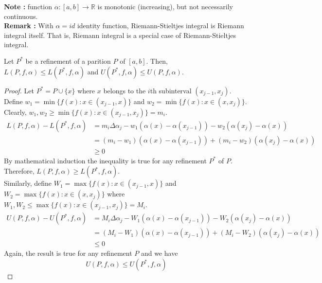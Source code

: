 \textbf{Note : } function $\alpha : [a,b] \to \mathbb{R}$ is monotonic (increasing), but not necessarily continuous.\\

\textbf{Remark : } With $\alpha = id$ identity function, Riemann-Stieltjes integral is Riemann integral itself.
	That is, Riemann integral is a special case of Riemann-Stieltjes integral.

\begin{theorem}
	Let $P^\ast$ be a refinement of a parition $P$ of $[a,b]$.
	Then, $L(P,f,\alpha) \le L(P^\ast,f,\alpha)$ and $U(P^\ast,f,\alpha) \le U(P,f,\alpha)$.
\end{theorem}
\begin{proof}
	Let $P^\ast = P \cup \{ x \}$ where $x$ belongs to the $i$th subinterval $(x_{j-1},x_j)$.
	Define $w_1 = \min \{ f(x) : x \in (x_{j-1},x) \}$ and $w_2 = \min \{ f(x) : x \in (x,x_j) \}$.
	Clearly, $w_1,w_2 \ge \min \{ f(x) : x \in (x_{j-1},x_j) \} = m_i$.
	\begin{align*}
		L(P,f,\alpha) - L(P^\ast,f,\alpha) & = m_i \Delta \alpha_j - w_1 (\alpha(x)-\alpha(x_{j-1})) - w_2 (\alpha(x_j) - \alpha(x)) \\
		& = (m_i - w_1)(\alpha(x)-\alpha(x_{j-1})) + (m_i - w_2)(\alpha(x_j)-\alpha(x))\\
		& \ge 0
	\end{align*}
	By mathematical induction the inequality is true for any refinement $P^\ast$ of $P$.
	Therefore, $L(P,f,\alpha) \ge L(P^\ast,f,\alpha)$.\\

	Similarly, define $W_1 = \max \{f(x) : x \in (x_{j-1},x) \}$ and $W_2 = \max \{ f(x) : x \in (x,x_j) \}$
	where $W_1,W_2 \le \max \{ f(x) : x \in (x_{j-1},x_j) \} = M_i$.
	\begin{align*}
		U(P,f,\alpha) - U(P^\ast,f,\alpha) & = M_i \Delta \alpha_j - W_1 (\alpha(x)-\alpha(x_{j-1})) - W_2 (\alpha(x_j) - \alpha(x)) \\
		& = (M_i - W_1)(\alpha(x)-\alpha(x_{j-1})) + (M_i - W_2)(\alpha(x_j)-\alpha(x))\\
		& \le 0
	\end{align*}
	Again, the result is true for any refinement $P$ and we have
	\[ U(P,f,\alpha) \le U(P^\ast,f,\alpha) \]
\end{proof}

